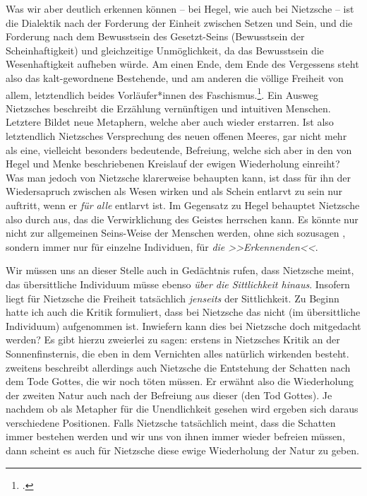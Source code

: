 \documentclass[12pt, a4paper, openany]{report}
\begin{document}
Was wir aber deutlich erkennen können -- bei Hegel, wie auch bei Nietzsche -- ist die Dialektik nach der Forderung der Einheit zwischen Setzen und Sein, und die Forderung nach dem Bewusstsein des Gesetzt-Seins (Bewusstsein der Scheinhaftigkeit) und gleichzeitige Unmöglichkeit, da das Bewusstsein die Wesenhaftigkeit aufheben würde.
Am einen Ende, dem Ende des Vergessens steht also das kalt-gewordnene Bestehende, und am anderen die völlige Freiheit von allem, letztendlich beides Vorläufer*innen des Faschismus.\footcite[Vgl.][???]{stephan_nietzscheanismus_2019}.
Ein Ausweg Nietzsches beschreibt die Erzählung vernünftigen und intuitiven Menschen.
Letztere Bildet neue Metaphern, welche aber auch wieder erstarren. 
Ist also letztendlich Nietzsches Versprechung des neuen offenen Meeres, gar nicht mehr als eine, vielleicht besonders bedeutende, Befreiung, welche sich aber in den von Hegel und Menke beschriebenen Kreislauf der ewigen Wiederholung einreiht?
Was man jedoch von Nietzsche klarerweise behaupten kann, ist dass für ihn der Wiedersapruch zwischen als Wesen wirken und als Schein entlarvt zu sein nur auftritt, wenn er \emph{für alle} entlarvt ist. 
Im Gegensatz zu Hegel behauptet Nietzsche also durch aus, das die Verwirklichung des Geistes herrschen kann. 
Es könnte nur nicht zur allgemeinen Seins-Weise der Menschen werden, ohne sich sozusagen , sondern immer nur für einzelne Individuen, für \emph{die >>Erkennenden<<}.

Wir müssen uns an dieser Stelle auch in Gedächtnis rufen, dass Nietzsche meint, das übersittliche Individuum müsse ebenso \emph{über die Sittlichkeit hinaus}. 
Insofern liegt für Nietzsche die Freiheit tatsächlich \emph{jenseits} der Sittlichkeit.
Zu Beginn hatte ich auch die Kritik formuliert, dass bei Nietzsche das  nicht (im übersittliche Individuum) aufgenommen ist.
Inwiefern kann dies bei Nietzsche doch mitgedacht werden? 
Es gibt hierzu zweierlei zu sagen: 
erstens in Nietzsches Kritik an der Sonnenfinsternis, die eben in dem Vernichten alles natürlich wirkenden besteht.
zweitens beschreibt allerdings auch Nietzsche die Entstehung der Schatten nach dem Tode Gottes, die wir noch töten müssen. 
Er erwähnt also die Wiederholung der zweiten Natur auch nach der Befreiung aus dieser (den Tod Gottes).
Je nachdem ob  als Metapher für die Unendlichkeit gesehen wird ergeben sich daraus verschiedene Positionen. 
Falls Nietzsche tatsächlich meint, dass die Schatten immer bestehen werden und wir uns von ihnen immer wieder befreien müssen, dann scheint es auch für Nietzsche diese ewige Wiederholung der Natur zu geben.
\end{document}
